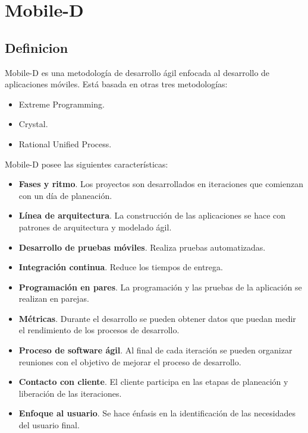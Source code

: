 \clearpage
\section{Mobile-D}
\subsection{Definicion \cite{B30}}
Mobile-D es una metodología de desarrollo ágil enfocada al desarrollo de aplicaciones móviles. Está basada en otras tres metodologías:
\begin{itemize}
	\item Extreme Programming.
	\item Crystal.
	\item Rational Unified Process.
\end{itemize}
Mobile-D posee las siguientes características:
\begin{itemize}
	\item \textbf{Fases y ritmo}. Los proyectos son desarrollados en iteraciones que comienzan con un día de planeación.
	\item \textbf{Línea de arquitectura}. La construcción de las aplicaciones se hace con patrones de arquitectura y modelado ágil.
	\item \textbf{Desarrollo de pruebas móviles}. Realiza pruebas automatizadas.
	\item \textbf{Integración continua}. Reduce los tiempos de entrega.
	\item \textbf{Programación en pares}. La programación y las pruebas de la aplicación se realizan en parejas.
	\item \textbf{Métricas}. Durante el desarrollo se pueden obtener datos que puedan medir el rendimiento de los procesos de desarrollo.
	\item \textbf{Proceso de software ágil}. Al final de cada iteración se pueden organizar reuniones con el objetivo de mejorar el proceso de desarrollo.
	\item \textbf{Contacto con cliente}. El cliente participa en las etapas de planeación y liberación de las iteraciones.
	\item \textbf{Enfoque al usuario}. Se hace énfasis en la identificación de las necesidades del usuario final.
\end{itemize}

